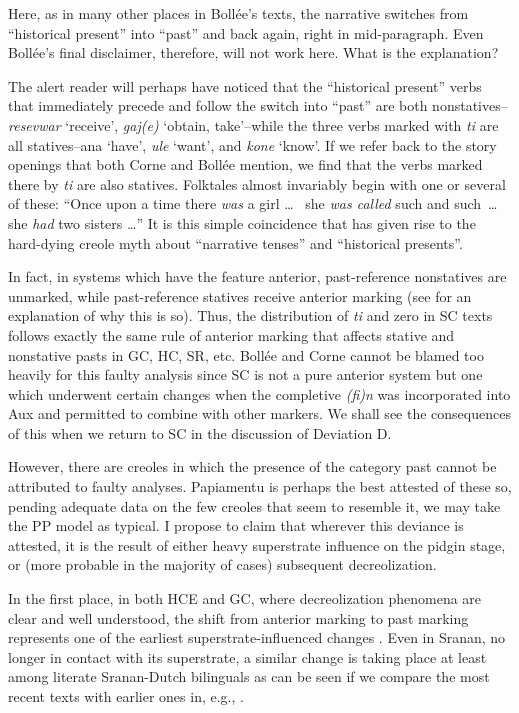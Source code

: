 Here, as in many other places in Bollée's texts, the narrative switches from ``historical present'' into ``past'' and back again, right in mid-paragraph. Even Bollée's final disclaimer, therefore, will not work here. What is the explanation?

The alert reader will perhaps have noticed that the ``historical present'' verbs that immediately precede and follow the switch into ``past'' are both nonstatives--\textit{resevwar} `receive', \textit{gaj(e)} `obtain, take'--while the three verbs marked with \textit{ti} are all statives--ana `have', \textit{ule} `want', and \textit{kone} `know'. If we refer back to the story openings that both Corne and Bollée mention, we find that the verbs marked there by \textit{ti} are also statives. Folktales almost invariably begin with one or several of these: ``Once upon a time there \textit{was} a girl \ldots~ she \textit{was called} such and such~\ldots~ she \textit{had} two sisters \ldots '' It is this simple coincidence that has given rise to the hard-dying creole myth about ``narrative tenses'' and ``historical presents''.

In fact, in systems which have the feature anterior, past-reference nonstatives are unmarked, while past-reference statives receive anterior
marking (see \citet[Chapter 2]{Bickerton1975} for an explanation of why this is so). Thus, the distribution of \textit{ti} and zero in SC texts follows exactly the same rule of anterior marking that affects stative and nonstative pasts in GC, HC, SR, etc.
Bollée and Corne cannot be blamed too heavily for this faulty analysis since SC is not a pure anterior system but one which under\-went certain changes when the completive \textit{(fi)n} was incorporated into Aux and permitted to combine with other markers. We shall see the consequences of this when we return to SC in the discussion of Deviation D.

However, there are creoles in which the presence of the category past cannot be attributed to faulty analyses. Papiamentu is perhaps the best attested of these so, pending adequate data on the few creoles that seem to resemble it, we may take the PP model as typical. I pro\-pose to claim that wherever this deviance is attested, it is the result of either heavy superstrate influence on the pidgin stage, or (more prob\-able in the majority of cases) subsequent decreolization.

In the first place, in both HCE and GC, where decreolization phenomena are clear and well understood, the shift from anterior mark\-ing to past marking represents one of the earliest superstrate-influenced changes \citep{Bickerton1975,Bickerton1977}. Even in Sranan, no longer in contact with its superstrate, a similar change is taking place at least among literate Sranan-Dutch bilinguals as can be seen if we compare the most recent texts with earlier ones in, e.g., \citet{Voorhoeve1976}.

